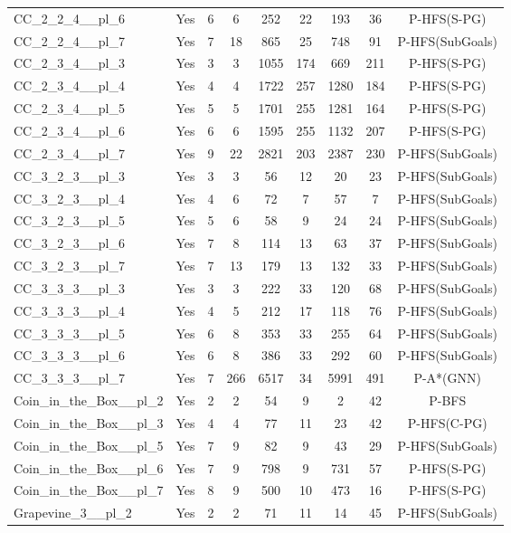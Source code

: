 \documentclass{article}
\begin{document}
\begin{tabular}{lcccccccc}
CC\_2\_2\_4\_\_pl\_6 & Yes & 6 & 6 & 252 & 22 & 193 & 36 & P-HFS(S-PG) \\
CC\_2\_2\_4\_\_pl\_7 & Yes & 7 & 18 & 865 & 25 & 748 & 91 & P-HFS(SubGoals) \\
CC\_2\_3\_4\_\_pl\_3 & Yes & 3 & 3 & 1055 & 174 & 669 & 211 & P-HFS(S-PG) \\
CC\_2\_3\_4\_\_pl\_4 & Yes & 4 & 4 & 1722 & 257 & 1280 & 184 & P-HFS(S-PG) \\
CC\_2\_3\_4\_\_pl\_5 & Yes & 5 & 5 & 1701 & 255 & 1281 & 164 & P-HFS(S-PG) \\
CC\_2\_3\_4\_\_pl\_6 & Yes & 6 & 6 & 1595 & 255 & 1132 & 207 & P-HFS(S-PG) \\
CC\_2\_3\_4\_\_pl\_7 & Yes & 9 & 22 & 2821 & 203 & 2387 & 230 & P-HFS(SubGoals) \\
CC\_3\_2\_3\_\_pl\_3 & Yes & 3 & 3 & 56 & 12 & 20 & 23 & P-HFS(SubGoals) \\
CC\_3\_2\_3\_\_pl\_4 & Yes & 4 & 6 & 72 & 7 & 57 & 7 & P-HFS(SubGoals) \\
CC\_3\_2\_3\_\_pl\_5 & Yes & 5 & 6 & 58 & 9 & 24 & 24 & P-HFS(SubGoals) \\
CC\_3\_2\_3\_\_pl\_6 & Yes & 7 & 8 & 114 & 13 & 63 & 37 & P-HFS(SubGoals) \\
CC\_3\_2\_3\_\_pl\_7 & Yes & 7 & 13 & 179 & 13 & 132 & 33 & P-HFS(SubGoals) \\
CC\_3\_3\_3\_\_pl\_3 & Yes & 3 & 3 & 222 & 33 & 120 & 68 & P-HFS(SubGoals) \\
CC\_3\_3\_3\_\_pl\_4 & Yes & 4 & 5 & 212 & 17 & 118 & 76 & P-HFS(SubGoals) \\
CC\_3\_3\_3\_\_pl\_5 & Yes & 6 & 8 & 353 & 33 & 255 & 64 & P-HFS(SubGoals) \\
CC\_3\_3\_3\_\_pl\_6 & Yes & 6 & 8 & 386 & 33 & 292 & 60 & P-HFS(SubGoals) \\
CC\_3\_3\_3\_\_pl\_7 & Yes & 7 & 266 & 6517 & 34 & 5991 & 491 & P-A*(GNN) \\
Coin\_in\_the\_Box\_\_pl\_2 & Yes & 2 & 2 & 54 & 9 & 2 & 42 & P-BFS \\
Coin\_in\_the\_Box\_\_pl\_3 & Yes & 4 & 4 & 77 & 11 & 23 & 42 & P-HFS(C-PG) \\
Coin\_in\_the\_Box\_\_pl\_5 & Yes & 7 & 9 & 82 & 9 & 43 & 29 & P-HFS(SubGoals) \\
Coin\_in\_the\_Box\_\_pl\_6 & Yes & 7 & 9 & 798 & 9 & 731 & 57 & P-HFS(S-PG) \\
Coin\_in\_the\_Box\_\_pl\_7 & Yes & 8 & 9 & 500 & 10 & 473 & 16 & P-HFS(S-PG) \\
Grapevine\_3\_\_pl\_2 & Yes & 2 & 2 & 71 & 11 & 14 & 45 & P-HFS(SubGoals) \\

\end{tabular}
\end{document}
